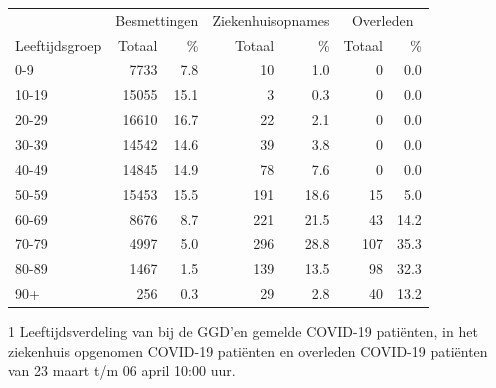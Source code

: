 \documentclass[
  english,
  man,floatsintext]{apa6}
\begin{document}
\begin{table}
\centering\begingroup\fontsize{11}{13}\selectfont

\begin{threeparttable}
\begin{tabular}{lrrrrrr}
\toprule
\multicolumn{1}{c}{ } & \multicolumn{2}{c}{Besmettingen} & \multicolumn{2}{c}{Ziekenhuisopnames} & \multicolumn{2}{c}{Overleden} \\
\cmidrule(l{3pt}r{3pt}){2-3} \cmidrule(l{3pt}r{3pt}){4-5} \cmidrule(l{3pt}r{3pt}){6-7}
Leeftijdsgroep & Totaal & \% & Totaal & \% & Totaal & \%\\
\midrule
0-9 & 7733 & 7.8 & 10 & 1.0 & 0 & 0.0\\
10-19 & 15055 & 15.1 & 3 & 0.3 & 0 & 0.0\\
20-29 & 16610 & 16.7 & 22 & 2.1 & 0 & 0.0\\
30-39 & 14542 & 14.6 & 39 & 3.8 & 0 & 0.0\\
40-49 & 14845 & 14.9 & 78 & 7.6 & 0 & 0.0\\
50-59 & 15453 & 15.5 & 191 & 18.6 & 15 & 5.0\\
60-69 & 8676 & 8.7 & 221 & 21.5 & 43 & 14.2\\
70-79 & 4997 & 5.0 & 296 & 28.8 & 107 & 35.3\\
80-89 & 1467 & 1.5 & 139 & 13.5 & 98 & 32.3\\
90+ & 256 & 0.3 & 29 & 2.8 & 40 & 13.2\\
\bottomrule
\end{tabular}
\begin{tablenotes}
\item[1] Leeftijdsverdeling van bij de GGD’en gemelde COVID-19 patiënten, in het ziekenhuis opgenomen COVID-19 patiënten en overleden COVID-19 patiënten van 23 maart t/m 06 april 10:00 uur.
\end{tablenotes}
\end{threeparttable}
\endgroup{}
\end{table}

\newpage
\end{document}
